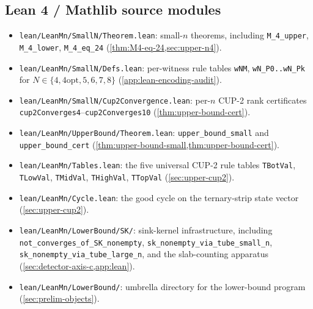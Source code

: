 \documentclass[11pt,a4paper]{article}
\theoremstyle{plain}
\theoremstyle{definition}
\begin{document}
\subsection{Lean 4 / Mathlib source modules}\label{app:manifest-lean}
\begin{itemize}[leftmargin=*]
\item \texttt{lean/LeanMn/SmallN/Theorem.lean}: small-$n$
 theorems, including \texttt{M\_4\_upper}, \texttt{M\_4\_lower},
 \texttt{M\_4\_eq\_24} (\cref{thm:M4-eq-24,sec:upper-n4}).
\item \texttt{lean/LeanMn/SmallN/Defs.lean}: per-witness rule
 tables \texttt{wNM}, \texttt{wN\_P0..wN\_Pk} for
 $N \in \{4, \text{4opt}, 5, 6, 7, 8\}$
 (\cref{app:lean-encoding-audit}).
\item \texttt{lean/LeanMn/SmallN/Cup2Convergence.lean}: per-$n$
 CUP-2 rank certificates \texttt{cup2Converges4}--\texttt{cup2Converges10}
 (\cref{thm:upper-bound-cert}).
\item \texttt{lean/LeanMn/UpperBound/Theorem.lean}:
 \texttt{upper\_bound\_small} and \texttt{upper\_bound\_cert}
 (\cref{thm:upper-bound-small,thm:upper-bound-cert}).
\item \texttt{lean/LeanMn/Tables.lean}: the five universal
 CUP-2 rule tables \texttt{TBotVal}, \texttt{TLowVal},
 \texttt{TMidVal}, \texttt{THighVal}, \texttt{TTopVal}
 (\cref{sec:upper-cup2}).
\item \texttt{lean/LeanMn/Cycle.lean}: the good cycle on the
 ternary-strip state vector (\cref{sec:upper-cup2}).
\item \texttt{lean/LeanMn/LowerBound/SK/}: sink-kernel
 infrastructure, including \texttt{not\_converges\_of\_SK\_nonempty},
 \texttt{sk\_nonempty\_via\_tube\_small\_n},
 \texttt{sk\_nonempty\_via\_tube\_large\_n}, and the
 slab-counting apparatus (\cref{sec:detector-axis-c,app:lean}).
\item \texttt{lean/LeanMn/LowerBound/}: umbrella directory for
 the lower-bound program (\cref{sec:prelim-objects}).
\end{itemize}
\end{document}
